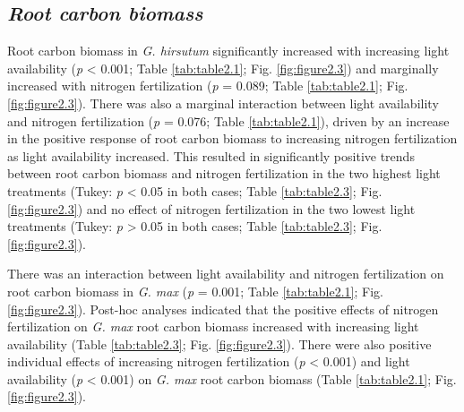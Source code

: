 \subsection{\textit{Root carbon biomass}}
Root carbon biomass in \textit{G. hirsutum} significantly increased with increasing light availability (\textit{p} < 0.001; Table \ref{tab:table2.1}; Fig. \ref{fig:figure2.3}) and marginally increased with nitrogen fertilization (\textit{p} = 0.089; Table \ref{tab:table2.1}; Fig. \ref{fig:figure2.3}). There was also a marginal interaction between light availability and nitrogen fertilization (\textit{p} = 0.076; Table \ref{tab:table2.1}), driven by an increase in the positive response of root carbon biomass to increasing nitrogen fertilization as light availability increased. This resulted in significantly positive trends between root carbon biomass and nitrogen fertilization in the two highest light treatments (Tukey: \textit{p} < 0.05 in both cases; Table \ref{tab:table2.3}; Fig. \ref{fig:figure2.3}) and no effect of nitrogen fertilization in the two lowest light treatments (Tukey: \textit{p} > 0.05 in both cases; Table \ref{tab:table2.3}; Fig. \ref{fig:figure2.3}). 

There was an interaction between light availability and nitrogen fertilization on root carbon biomass in \textit{G. max} (\textit{p} = 0.001; Table \ref{tab:table2.1}; Fig. \ref{fig:figure2.3}). Post-hoc analyses indicated that the positive effects of nitrogen fertilization on \textit{G. max} root carbon biomass increased with increasing light availability (Table \ref{tab:table2.3}; Fig. \ref{fig:figure2.3}). There were also positive individual effects of increasing nitrogen fertilization (\textit{p} < 0.001) and light availability (\textit{p} < 0.001) on \textit{G. max} root carbon biomass (Table \ref{tab:table2.1}; Fig. \ref{fig:figure2.3}).


